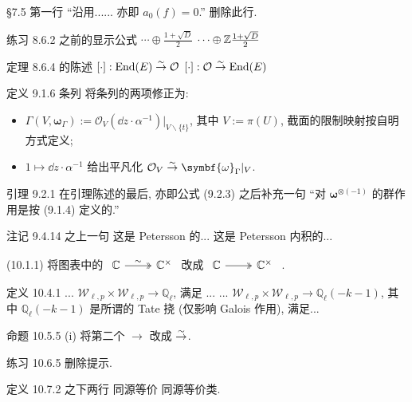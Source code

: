 \documentclass{AJerrata}
\newcommand{\bomega}{\symbf{\omega}}	%
\begin{document}
\begin{Errata}
		\item[\S 7.5 第一行 ``沿用...... 亦即 $a_0(f)=0$.'']
		删除此行.
		
		\item[练习 8.6.2 之前的显示公式]
		\Orig $\cdots \oplus \frac{1 + \sqrt{D}}{2}$
		\Corr $\cdots \oplus \mathbb{Z} \frac{1 + \sqrt{D}}{2}$
		
		\item[定理 8.6.4 的陈述]
		\Orig $[\cdot]: \operatorname{End}(E) \stackrel{\sim}{\rightarrow} \mathcal{O}$
		\Corr $[\cdot]: \mathcal{O} \stackrel{\sim}{\rightarrow} \operatorname{End}(E)$
		
		\item[定义 9.1.6 条列]
		将条列的两项修正为:
		\begin{itemize}
			\item $\Gamma(V, \bomega_\Gamma) := \mathcal{O}_V (\dd z \cdot \alpha^{-1}) |_{V \smallsetminus \{t\}}$, 其中 $V := \pi(U)$, 截面的限制映射按自明方式定义;
			\item $1 \mapsto \dd z \cdot \alpha^{-1}$ 给出平凡化 $\mathcal{O}_V \rightiso \bomega_\Gamma |_V$.
		\end{itemize}
		
		\item[引理 9.2.1]
		在引理陈述的最后, 亦即公式 (9.2.3) 之后补充一句 ``对 $\bomega^{\otimes (-1)}$ 的群作用是按 (9.1.4) 定义的.''

		\item[注记 9.4.14 之上一句]
		\Orig 这是 Petersson 的...
		\Corr 这是 Petersson 内积的...
		
		\item[(10.1.1)] 将图表中的
		$\begin{tikzcd} \mathbb{C} \arrow[twoheadrightarrow, r, "\sim"] & \mathbb{C}^\times \end{tikzcd}$
		改成
		$\begin{tikzcd} \mathbb{C} \arrow[twoheadrightarrow, r] & \mathbb{C}^\times \end{tikzcd}$ .

		\item[定义 10.4.1]
		\Orig ... $\mathcal{W}_{\ell, p} \times \mathcal{W}_{\ell, p} \to \mathbb{Q}_\ell$, 满足 ...
		\Corr ... $\mathcal{W}_{\ell, p} \times \mathcal{W}_{\ell, p} \to \mathbb{Q}_\ell(-k-1)$, 其中 $\mathbb{Q}_\ell(-k-1)$ 是所谓的 Tate 挠 (仅影响 Galois 作用), 满足...
		
		\item[命题 10.5.5 (i)]
		将第二个 $\to$ 改成 $\stackrel{\sim}{\rightarrow}$.
		
		\item[练习 10.6.5]
		删除提示.
		
		\item[定义 10.7.2 之下两行]
		\Orig 同源等价
		\Corr 同源等价类.
	\end{Errata}
\end{document}
